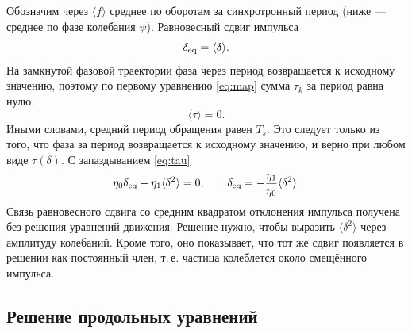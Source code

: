 Обозначим через $\langle f\rangle$ среднее по оборотам за синхротронный период (ниже --- среднее по фазе колебания $\psi$). Равновесный сдвиг импульса
\begin{equation}
\label{eq:deq-def}
\delta_{\mathrm{eq}}=\langle\delta\rangle.
\end{equation}
На замкнутой фазовой траектории фаза через период возвращается к исходному значению, поэтому по первому уравнению \eqref{eq:map} сумма $\tau_k$ за период равна нулю:
\begin{equation}
\label{eq:tau-avg-exact}
\langle\tau\rangle=0.
\end{equation}
Иными словами, средний период обращения равен $T_s$. Это следует только из того, что фаза за период возвращается к исходному значению, и верно при любом виде $\tau(\delta)$. С запаздыванием \eqref{eq:tau}
\begin{equation}
\label{eq:deq-avg}
\eta_0\delta_{\mathrm{eq}}+\eta_1\langle\delta^2\rangle=0,
\qquad
\delta_{\mathrm{eq}}=-\frac{\eta_1}{\eta_0}\langle\delta^2\rangle.
\end{equation}
Связь равновесного сдвига со средним квадратом отклонения импульса получена без решения уравнений движения. Решение нужно, чтобы выразить $\langle\delta^2\rangle$ через амплитуду колебаний. Кроме того, оно показывает, что тот же сдвиг появляется в решении как постоянный член, т.\,е. частица колеблется около смещённого импульса.

\subsection{Решение продольных уравнений}
\label{sec:solution}

